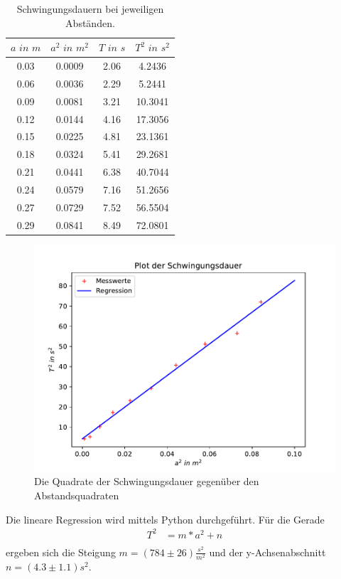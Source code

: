 \begin{table}
  \centering
  \caption{Schwingungsdauern bei jeweiligen Abständen.}
  \label{tab:data2}
  \begin{tabular}{c c c c }
    \toprule $a \, \,  in \,\, m$ & $a^2 \,\, in \,\,  m^2$ & $T \,\, in \,\, s$ & $T^2 \,\, in  \,\, s^2$ \\
    \midrule
    0.03 & 0.0009 & 2.06 &  4.2436\\
    0.06 & 0.0036 & 2.29 &  5.2441\\
    0.09 & 0.0081 & 3.21 &  10.3041\\
    0.12 & 0.0144 & 4.16 &  17.3056\\
    0.15 & 0.0225 & 4.81 &  23.1361\\
    0.18 & 0.0324 & 5.41 &  29.2681\\
    0.21 & 0.0441 & 6.38 &  40.7044\\
    0.24 & 0.0579 & 7.16 &  51.2656\\
    0.27 & 0.0729 & 7.52 &  56.5504\\
    0.29 & 0.0841 & 8.49 &  72.0801\\
    \bottomrule
  \end{tabular}
\end{table}

\begin{figure}
  \includegraphics[width=\textwidth]{plot1.pdf}
  \caption{Die Quadrate der Schwingungsdauer gegenüber den Abstandsquadraten}
\end{figure}

Die lineare Regression wird mittels Python durchgeführt. Für die Gerade
\begin{align}
  T^2 &= m * a^2 + n\\
\end{align}
ergeben sich die Steigung $m = (784 \pm 26) \frac{s^2}{m^2}$ und der y-Achsenabschnitt $n = (4.3 \pm 1.1) s^2$.

